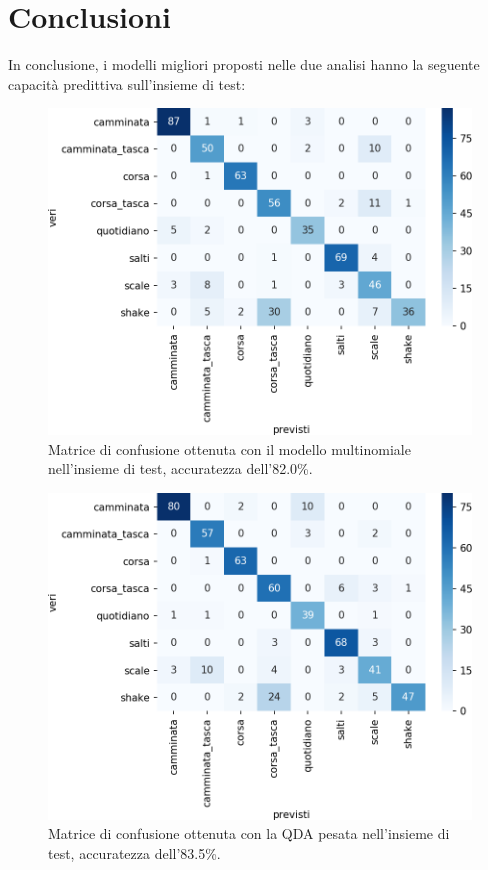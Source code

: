 \documentclass[main.tex]{subfiles}
\begin{document}
\section{Conclusioni}
In conclusione, i modelli migliori proposti nelle due analisi hanno la seguente capacità predittiva sull'insieme di test:
\begin{figure}[H]
	\centering
	\includegraphics[width=\confusion]{../../figure/confusionMatrix-Mn-test.png}
	\caption{Matrice di confusione ottenuta con il modello multinomiale nell'insieme di test, accuratezza dell'82.0\%.}
	\label{fig:mn-test}
\end{figure}

\begin{figure}[H]
	\centering
	\includegraphics[width=\confusion]{../../figure/confusionMatrix-QDA-penalizzata-test.png}
	\caption{Matrice di confusione ottenuta con la QDA pesata nell'insieme di test, accuratezza dell'83.5\%.}
	\label{fig:qda-test}
\end{figure}
\end{document}
